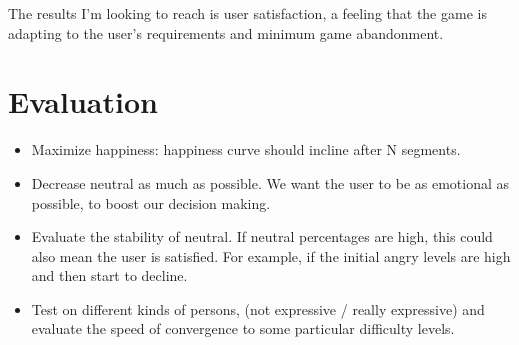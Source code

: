 \documentclass[11pt]{article}
\begin{document}
The results I'm looking to reach is user satisfaction, a feeling that the game is adapting to the user's requirements and minimum game abandonment.

\section{Evaluation}


\begin{itemize}
\item Maximize happiness: happiness curve should incline after N segments.
\item Decrease neutral as much as possible. We want the user to be as emotional as possible, to boost our decision making.
\item Evaluate the stability of neutral. If neutral percentages are high, this could also mean the user is satisfied. For example, if the initial angry levels are high and then start to decline.
\item Test on different kinds of persons, (not expressive / really expressive) and evaluate the speed of convergence to some particular difficulty levels.

\end{itemize}
\end{document}

